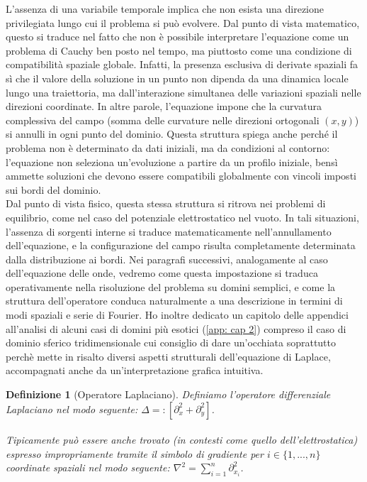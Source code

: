 \documentclass[a4paper,12pt]{report}
\newtheorem{definizione}{Definizione}[chapter]
\begin{document}
L’assenza di una variabile temporale implica che non esista una direzione privilegiata lungo cui il problema si può evolvere. Dal punto di vista matematico, questo si traduce nel fatto che non è possibile interpretare l’equazione come un problema di Cauchy ben posto nel tempo, ma piuttosto come una condizione di compatibilità spaziale globale. Infatti, la presenza esclusiva di derivate spaziali fa sì che il valore della soluzione in un punto non dipenda da una dinamica locale lungo una traiettoria, ma dall’interazione simultanea delle variazioni spaziali nelle direzioni coordinate. In altre parole, l’equazione impone che la curvatura complessiva del campo (somma delle curvature nelle direzioni ortogonali $(x,y)$) si annulli in ogni punto del dominio. Questa struttura spiega anche perché il problema non è determinato da dati iniziali, ma da condizioni al contorno: l’equazione non seleziona un’evoluzione a partire da un profilo iniziale, bensì ammette soluzioni che devono essere compatibili globalmente con vincoli imposti sui bordi del dominio.
\\Dal punto di vista fisico, questa stessa struttura si ritrova nei problemi di equilibrio, come nel caso del potenziale elettrostatico nel vuoto. In tali situazioni, l’assenza di sorgenti interne si traduce matematicamente nell’annullamento dell'equazione, e la configurazione del campo risulta completamente determinata dalla distribuzione ai bordi. Nei paragrafi successivi, analogamente al caso dell'equazione delle onde, vedremo come questa impostazione si traduca operativamente nella risoluzione del problema su domini semplici, e come la struttura dell’operatore conduca naturalmente a una descrizione in termini di modi spaziali e serie di Fourier. Ho inoltre dedicato un capitolo delle appendici all'analisi di alcuni casi di domini più esotici (\ref{app: cap 2}) compreso il caso di dominio sferico tridimensionale cui consiglio di dare un'occhiata soprattutto perchè mette in risalto diversi aspetti strutturali dell'equazione di Laplace, accompagnati anche da un'interpretazione grafica intuitiva.

\begin{definizione}[Operatore Laplaciano]\label{def: 4.12}
    Definiamo l'operatore differenziale Laplaciano nel modo seguente: $\Delta =:[\partial_x^2+\partial_y^2]$.
    \\
    \\Tipicamente può essere anche trovato (in contesti come quello dell'elettrostatica) espresso impropriamente tramite il simbolo di gradiente per $i\in\{1,...,n\}$ coordinate spaziali nel modo seguente: $\nabla^2=\displaystyle\sum_{i=1}^n\partial_{x_i}^2$.
\end{definizione}
\end{document}
